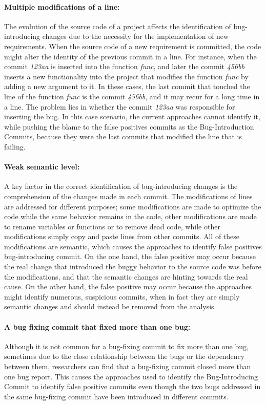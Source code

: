 \documentclass[a4paper, 12pt]{book}
\begin{document}
\paragraph {Multiple modifications of a line:} The evolution of the source code of a project affects the identification of bug-introducing changes due to the necessity for the implementation of new requirements. When the source code of a new requirement is committed, the code might alter the identity of the previous commit in a line. For instance, when the commit \emph{123aa} is inserted into the function \emph{func}, and later the commit \emph{456bb} inserts a new functionality into the project that modifies the function \emph{func} by adding a new argument to it. In these cases, the last commit that touched the line of the function \emph{func} is the commit \emph{456bb}, and it may recur for a long time in a line. The problem lies in whether the commit \emph{123aa} was responsible for inserting the bug. In this case scenario, the current approaches cannot identify it, while pushing the blame to the false positives commits as the Bug-Introduction Commits, because they were the last commits that modified the line that is failing.

\paragraph {Weak semantic level:}  A key factor in the correct identification of bug-introducing changes is the comprehension of the changes made in each commit. The modifications of lines are addressed for different purposes; some modifications are made to optimize the code while the same behavior remains in the code, other modifications are made to rename variables or functions or to remove dead code, while other modifications simply copy and paste lines from other commits. All of these modifications are semantic, which causes the approaches to identify false positives bug-introducing commit. On the one hand, the false positive may occur because the real change that introduced the buggy behavior to the source code was before the modifications, and that the semantic changes are hinting towards the real cause. On the other hand, the false positive may occur because the approaches might identify numerous, suspicious commits, when in fact they are simply semantic changes and should instead be removed from the analysis.

\paragraph {A bug fixing commit that fixed more than one bug:} Although it is not common for a bug-fixing commit to fix more than one bug, sometimes due to the close relationship between the bugs or the dependency between them, researchers can find that a bug-fixing commit closed more than one bug report. This causes the approaches used to identify the Bug-Introducing Commit to identify false positive commits even though the two bugs addressed in the same bug-fixing commit have been introduced in different commits. 
\end{document}
